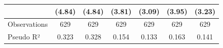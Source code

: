 {\begin{tabular}{l*{6}{c}}
                    &      (4.84)         &      (4.84)         &      (3.81)         &      (3.09)         &      (3.95)         &      (3.23)         \\
\midrule
Observations        &         629         &         629         &         629         &         629         &         629         &         629         \\
Pseudo R²           &       0.323         &       0.328         &       0.154         &       0.133         &       0.163         &       0.141         \\
\bottomrule
\end{tabular}
}
